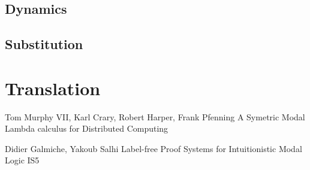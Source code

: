 \documentclass[12pt]{article}
\begin{document}
\subsection{Dynamics}

\subsection{Substitution}

\section{Translation}

\begin{thebibliography}{9}
 	Tom Murphy VII, Karl Crary, Robert Harper, Frank Pfenning
	A Symetric Modal Lambda calculus for Distributed Computing

	Didier Galmiche, Yakoub Salhi
	Label-free Proof Systems for Intuitionistic Modal Logic IS5
\end{thebibliography}
\end{document}
